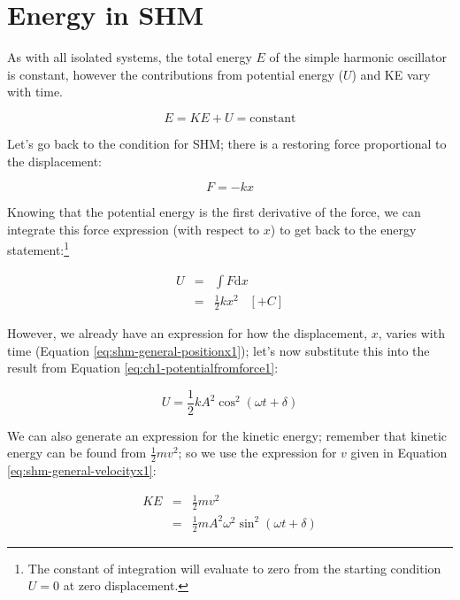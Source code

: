 \documentclass[
]{book}
\begin{document}
\hypertarget{sec:ch1-shm-energy1}{%
\section{Energy in SHM}\label{sec:ch1-shm-energy1}}

As with all isolated systems, the total energy \(E\) of the simple harmonic oscillator is constant, however the contributions from potential energy (\(U\)) and KE vary with time.

\begin{equation}
E = KE + U = \textrm{constant}
\end{equation}

Let's go back to the condition for SHM; there is a restoring force proportional to the displacement:

\begin{equation}
F = -kx
\end{equation}

Knowing that the potential energy is the first derivative of the force, we can integrate this force expression (with respect to \(x\)) to get back to the energy statement:\footnote{The constant of integration will evaluate to zero from the starting condition \(U = 0\) at zero displacement.}

\begin{equation}
\begin{array}{rcl}
U &=& \int F \mathrm{d}x \\
& =& \frac{1}{2}kx^2 \hspace{10pt} [+C]
\end{array}
\label{eq:ch1-potentialfromforce1}
\end{equation}

However, we already have an expression for how the displacement, \(x\), varies with time (Equation \eqref{eq:shm-general-positionx1}); let's now substitute this into the result from Equation \eqref{eq:ch1-potentialfromforce1}:

\begin{equation}
U = \frac{1}{2}kA^2 \cos^2 (\omega t + \delta)
\label{eq:ch1-potentialfromforce2}
\end{equation}

We can also generate an expression for the kinetic energy; remember that kinetic energy can be found from \(\frac{1}{2}mv^2\); so we use the expression for \(v\) given in Equation \eqref{eq:shm-general-velocityx1}:

\begin{equation}
\begin{array}{rcl}
KE &=& \frac{1}{2} mv^2 \\
& =& \frac{1}{2} m A^2 \omega^2 \sin^2 (\omega t + \delta)
\end{array}
\label{eq:ch1-potentialfromforce3}
\end{equation}
\end{document}
